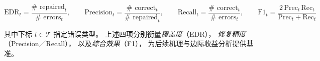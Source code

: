 \documentclass[10pt]{article} %
\numberwithin{equation}{section}
\begin{document}
{
\[
\mathrm{EDR}_t=\frac{\#\text{ repaired}_t}{\#\text{ errors}_t},\qquad
\mathrm{Precision}_t=\frac{\#\text{ correct}_t}{\#\text{ repaired}_t},\qquad
\mathrm{Recall}_t=\frac{\#\text{ correct}_t}{\#\text{ errors}_t},\qquad
\mathrm{F1}_t=\frac{2\,\mathrm{Prec}_t\,\mathrm{Rec}_t}{\mathrm{Prec}_t+\mathrm{Rec}_t}
\]}

\noindent
其中下标 \(t\in\mathcal{T}\) 指定错误类型。
上述四项分别衡量\emph{覆盖度}（EDR），
\emph{修复精度}（Precision／Recall），
以及\emph{综合效果}（F1），
为后续机理与边际收益分析提供基准。

\begin{table}[htbp]
\centering
\footnotesize
\setlength{\tabcolsep}{3pt}
\renewcommand{\arraystretch}{1.05}


\end{table}
\end{document}
